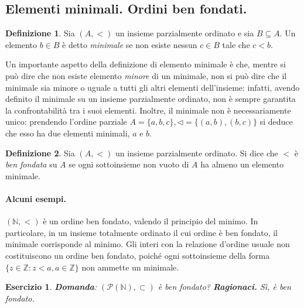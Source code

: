 \documentclass[fontsize = 11 pt, paper=A4, oneside, index=totoc, hyperref]{article}
\theoremstyle{definition}
\newtheorem{dfn}{Definizione}[section]
\theoremstyle{plain}
\newtheorem{exe}{Esercizio}[section]
\newcommand{\N}{\mathbb{N}}
\begin{document}
\subsection{Elementi minimali. Ordini ben fondati.}
\begin{dfn}
  Sia \((A, <)\) un insieme parzialmente ordinato e sia \(B \subseteq A\). Un elemento \(b \in B\) è detto \emph{minimale} se non esiste nessun \(c \in B\) tale che \(c < b\).
\end{dfn}
Un importante aspetto della definizione di elemento minimale è che, mentre si può dire che non esiste elemento \emph{minore} di un minimale, non si può dire che il minimale sia minore o uguale a tutti gli altri elementi dell'insieme: infatti, avendo definito il minimale su un insieme parzialmente ordinato, non è sempre garantita la confrontabilità tra i suoi elementi. Inoltre, il minimale non è necessariamente unico: prendendo l'ordine parziale \(A = \lbrace a,b,c \rbrace, \lhd = \lbrace (a,b), (b,c) \rbrace\) si deduce che esso ha due elementi minimali, \(a\) e \(b\).

\begin{dfn}
  Sia \((A,<)\) un insieme parzialmente ordinato. Si dice che \(<\) è \emph{ben fondata} su \(A\) se ogni sottoinsieme non vuoto di \(A\) ha almeno un elemento minimale.
\end{dfn}

\paragraph{Alcuni esempi.} \((\N, <)\) è un ordine ben fondato, valendo il principio del minimo. In particolare, in un insieme totalmente ordinato il cui ordine è ben fondato, il minimale corrisponde al minimo. Gli interi con la relazione d'ordine usuale non costituiscono un ordine ben fondato, poiché ogni sottoinsieme della forma \(\lbrace z \in \mathbb{Z} \colon z < a, a \in \mathbb{Z}\rbrace\) non ammette un minimale.

\begin{exe}
{\bf Domanda}: \((\mathcal{P}(\N), \subset)\) è ben fondato?
{\bf Ragionaci.} Sì, è ben fondato.
\end{exe}
\end{document}
